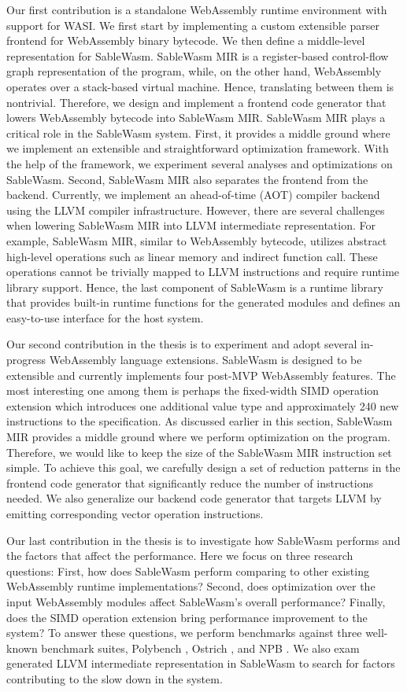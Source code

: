 Our first contribution is a standalone WebAssembly runtime environment with support for WASI. We first start by implementing a custom extensible parser frontend for WebAssembly binary bytecode. We then define a middle-level representation for SableWasm. SableWasm MIR is a register-based control-flow graph representation of the program, while, on the other hand, WebAssembly operates over a stack-based virtual machine. Hence, translating between them is nontrivial. Therefore, we design and implement a frontend code generator that lowers WebAssembly bytecode into SableWasm MIR. SableWasm MIR plays a critical role in the SableWasm system. First, it provides a middle ground where we implement an extensible and straightforward optimization framework. With the help of the framework, we experiment several analyses and optimizations on SableWasm. Second, SableWasm MIR also separates the frontend from the backend. Currently, we implement an ahead-of-time (AOT) compiler backend using the LLVM compiler infrastructure. However, there are several challenges when lowering SableWasm MIR into LLVM intermediate representation. For example, SableWasm MIR, similar to WebAssembly bytecode, utilizes abstract high-level operations such as linear memory and indirect function call. These operations cannot be trivially mapped to LLVM instructions and require runtime library support. Hence, the last component of SableWasm is a runtime library that provides built-in runtime functions for the generated modules and defines an easy-to-use interface for the host system. 

Our second contribution in the thesis is to experiment and adopt several in-progress WebAssembly language extensions. SableWasm is designed to be extensible and currently implements four post-MVP WebAssembly features. The most interesting one among them is perhaps the fixed-width SIMD operation extension which introduces one additional value type and approximately 240 new instructions to the specification. As discussed earlier in this section, SableWasm MIR provides a middle ground where we perform optimization on the program. Therefore, we would like to keep the size of the SableWasm MIR instruction set simple. To achieve this goal, we carefully design a set of reduction patterns in the frontend code generator that significantly reduce the number of instructions needed. We also generalize our backend code generator that targets LLVM by emitting corresponding vector operation instructions. 

Our last contribution in the thesis is to investigate how SableWasm performs and the factors that affect the performance. Here we focus on three research questions: First, how does SableWasm perform comparing to other existing WebAssembly runtime implementations? Second, does optimization over the input WebAssembly modules affect SableWasm's overall performance? Finally, does the SIMD operation extension bring performance improvement to the system? To answer these questions, we perform benchmarks against three well-known benchmark suites, Polybench \cite{polybench}, Ostrich \cite{ostrich}, and NPB \cite{npb}. We also exam generated LLVM intermediate representation in SableWasm to search for factors contributing to the slow down in the system.

